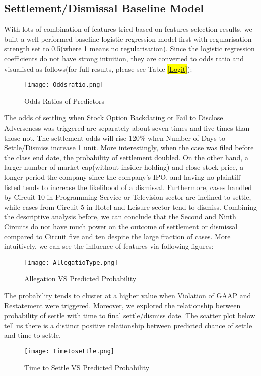 \subsection{Settlement/Dismissal Baseline Model}
With lots of combination of features tried based on features selection results, we built a well-performed baseline logistic regression model first with regularisation strength set to 0.5(where 1 means no regularisation). Since the logistic regression coefficients do not have strong intuition, they are converted to odds ratio and visualised as follows(for full results, please see Table \hl{\ref{Logit}}):
\begin{figure}[H]
  \centering
  \texttt{[image: Oddsratio.png]}
  \caption{Odds Ratios of Predictors}
\end{figure}
The odds of settling when Stock Option Backdating or Fail to Disclose Adverseness was triggered are separately about seven times and five times than those not. The settlement odds will rise 120\% when Number of Days to Settle/Dismiss increase 1 unit. More interestingly, when the case was filed before the class end date, the probability of settlement doubled. On the other hand, a larger number of market cap(without insider holding) and close stock price, a longer period the company since the company's IPO, and having no plaintiff listed tends to increase the likelihood of a dismissal. Furthermore, cases handled by Circuit 10 in Programming Service or Television sector are inclined to settle, while cases from Circuit 5 in Hotel and Leisure sector tend to dismiss. Combining the descriptive analysis before, we can conclude that the Second and Ninth Circuits do not have much power on the outcome of settlement or dismissal compared to Circuit five and ten despite the large fraction of cases. More intuitively, we can see the influence of features via following figures:
\begin{figure}[H]
  \centering
  \texttt{[image: AllegatioType.png]}
  \caption{Allegation VS Predicted Probability}
\end{figure}
The probability tends to cluster at a higher value when Violation of GAAP and Restatement were triggered. Moreover, we explored the relationship between probability of settle with time to final settle/dismiss date. The scatter plot below tell us there is a distinct positive relationship between predicted chance of settle and time to settle.
\begin{figure}[H]
  \centering
  \texttt{[image: Timetosettle.png]}
  \caption{Time to Settle VS Predicted Probability}
\end{figure}

